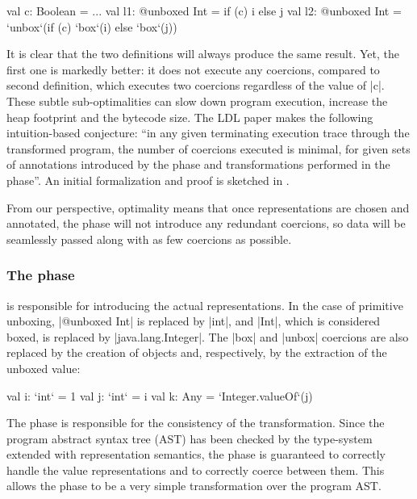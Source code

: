 \begin{lstlisting-nobreak}
val c: Boolean = ...
val l1: @unboxed Int = if (c) i else j
val l2: @unboxed Int = `unbox`(if (c) `box`(i) else `box`(j))
\end{lstlisting-nobreak}

It is clear that the two definitions will always produce the same
result. Yet, the first one is markedly better: it does not execute
any coercions, compared to second definition, which executes two
coercions regardless of the value of |c|. These subtle
sub-optimalities can slow down program execution, increase the heap
footprint and the bytecode size.
The LDL paper \cite{ldl} makes the following
intuition-based conjecture: ``in any given terminating
execution trace through the transformed program, the number of
coercions executed is minimal,
for given sets of annotations introduced by
the \inject{} phase and transformations performed in the \commit{}
phase''. An initial formalization and proof is sketched in \cite{ldl-form}.

From our perspective, optimality means that once representations are chosen and annotated,
the \coerce{} phase will not introduce any redundant coercions, so data will be seamlessly passed along with as few coercions as possible.

\vspace{-0.3em}
\subsubsection{The \commit{} phase} is responsible for introducing the actual
representations. In the case of primitive unboxing, |@unboxed Int| is
replaced by |int|, and |Int|, which is considered boxed, is replaced
by |java.lang.Integer|. The |box| and |unbox| coercions are also
replaced by the creation of objects and, respectively, by the
extraction of the unboxed value:

\vspace{-0.4em}
\begin{lstlisting-nobreak}
val i: `int` = 1
val j: `int` = i
val k: Any = `Integer.valueOf`(j)
\end{lstlisting-nobreak}

The \commit{} phase is responsible for the consistency of the transformation. Since the program abstract syntax tree (AST) has been checked by the type-system extended with representation semantics, the \commit{} phase is guaranteed to correctly handle the value representations and to correctly coerce between them. This allows the \commit{} phase to be a very simple transformation over the program AST.

